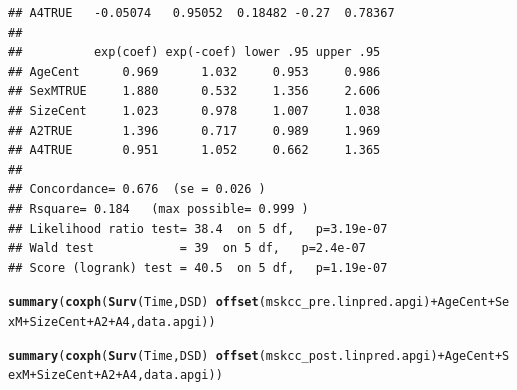 \documentclass{article}\usepackage[]{graphicx}\usepackage[]{color}
\makeatletter
\newcommand{\hlopt}[1]{\textcolor[rgb]{0,0,0}{#1}}%
\newcommand{\hlstd}[1]{\textcolor[rgb]{0.345,0.345,0.345}{#1}}%
\newcommand{\hlkwd}[1]{\textcolor[rgb]{0.737,0.353,0.396}{\textbf{#1}}}%
\newenvironment{kframe}{%
 \def\at@end@of@kframe{}%
 \ifinner\ifhmode%
  \def\at@end@of@kframe{\end{minipage}}%
  \begin{minipage}{\columnwidth}%
 \fi\fi%
 \def\FrameCommand##1{\hskip\@totalleftmargin \hskip-\fboxsep
 \colorbox{shadecolor}{##1}\hskip-\fboxsep
     \hskip-\linewidth \hskip-\@totalleftmargin \hskip\columnwidth}%
 \MakeFramed {\advance\hsize-\width
   \@totalleftmargin\z@ \linewidth\hsize
   \@setminipage}}%
 {\par\unskip\endMakeFramed%
 \at@end@of@kframe}
\newenvironment{knitrout}{}{} %
\makeatother
\begin{document}
\begin{knitrout}
\begin{kframe}
\begin{verbatim}
## A4TRUE   -0.05074   0.95052  0.18482 -0.27  0.78367
## 
##          exp(coef) exp(-coef) lower .95 upper .95
## AgeCent      0.969      1.032     0.953     0.986
## SexMTRUE     1.880      0.532     1.356     2.606
## SizeCent     1.023      0.978     1.007     1.038
## A2TRUE       1.396      0.717     0.989     1.969
## A4TRUE       0.951      1.052     0.662     1.365
## 
## Concordance= 0.676  (se = 0.026 )
## Rsquare= 0.184   (max possible= 0.999 )
## Likelihood ratio test= 38.4  on 5 df,   p=3.19e-07
## Wald test            = 39  on 5 df,   p=2.4e-07
## Score (logrank) test = 40.5  on 5 df,   p=1.19e-07
\end{verbatim}
\begin{alltt}
\hlkwd{summary}\hlstd{(}\hlkwd{coxph}\hlstd{(}\hlkwd{Surv}\hlstd{(Time, DSD)} \hlopt{~} \hlkwd{offset}\hlstd{(mskcc_pre.linpred.apgi)} \hlopt{+} \hlstd{AgeCent} \hlopt{+} \hlstd{SexM} \hlopt{+} \hlstd{SizeCent} \hlopt{+} \hlstd{A2} \hlopt{+} \hlstd{A4, data.apgi))}
\end{alltt}


{\ttfamily\noindent\color{warningcolor}{\#\# Warning in fitter(X, Y, strats, offset, init, control, weights = weights, : Ran out of iterations and did not converge}}

{\ttfamily\noindent\bfseries\color{errorcolor}{\#\# Error in fitter(X, Y, strats, offset, init, control, weights = weights, : NA/NaN/Inf in foreign function call (arg 6)}}\begin{alltt}
\hlkwd{summary}\hlstd{(}\hlkwd{coxph}\hlstd{(}\hlkwd{Surv}\hlstd{(Time, DSD)} \hlopt{~} \hlkwd{offset}\hlstd{(mskcc_post.linpred.apgi)} \hlopt{+} \hlstd{AgeCent} \hlopt{+} \hlstd{SexM} \hlopt{+} \hlstd{SizeCent} \hlopt{+} \hlstd{A2} \hlopt{+} \hlstd{A4, data.apgi))}
\end{alltt}


{\ttfamily\noindent\color{warningcolor}{\#\# Warning in fitter(X, Y, strats, offset, init, control, weights = weights, : Ran out of iterations and did not converge}}


\end{kframe}
\end{knitrout}
\end{document}
